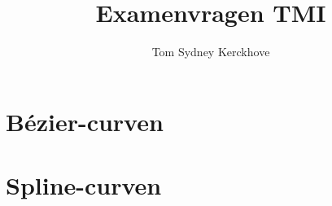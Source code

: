 \documentclass[12pt,a4paper]{article}
\author{Tom Sydney Kerckhove}
\title{Examenvragen TMI}
\begin{document}
\pagebreak





\part{B\'ezier-curven}



\iffalse
\section{Bespreek de variatieverminderingseigenschap.}
\section{Wat betekent de variatieverminderingseigenschap voor B\'ezier curven?}
\section{Wat betekent de variatieverminderingseigenschap voor splines?}
\section{Bespreek subdivisie en geef de methode.}
\section{Bespreek graadverhoding, geef het bewijs en leg uit waarvoor het dient.}
\section{Bespreek tensorproductoppervlakken aan de hand van B\'ezier-oppervlakken.}
\section{Bereken de tweede partiele afgeleide in de hoekpunten van een B\'ezier-oppervlak, leg uit en geef grafisch weer.}
\fi

\part{Spline-curven}




\iffalse
\section{Hoe kan je ervoor zorgen dat een deel van een spline curve een recht lijnstuk is?}
\fi
\end{document}
